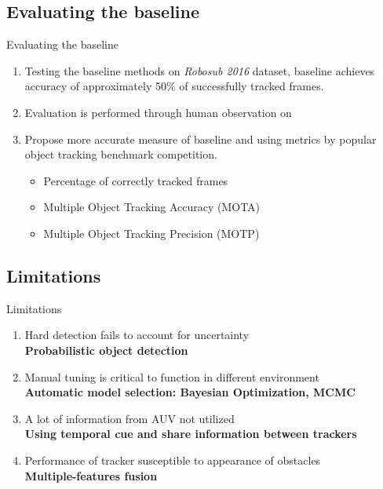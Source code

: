 \documentclass{beamer}
\begin{document}
\subsection{Evaluating the baseline}
\begin{frame}{Evaluating the baseline}
    \begin{enumerate}
        \item Testing the baseline methods on \textit{Robosub 2016} dataset, baseline achieves accuracy of approximately 50\% of successfully tracked frames.
        \item Evaluation is performed through human observation on
        \item Propose more accurate measure of baseline and using metrics by popular object tracking benchmark competition.
            \begin{itemize}
                \item Percentage of correctly tracked frames
                \item Multiple Object Tracking Accuracy (MOTA)
                \item Multiple Object Tracking Precision (MOTP)
            \end{itemize}
    \end{enumerate}
\end{frame}

\subsection{Limitations}
\begin{frame}{Limitations}
    \begin{enumerate}
        \item Hard detection fails to account for uncertainty \\ \textbf{Probabilistic object detection}
        \item Manual tuning is critical to function in different environment \\ \textbf{Automatic model selection: Bayesian Optimization, MCMC}
        \item A lot of information from AUV not utilized \\ \textbf{Using temporal cue and share information between trackers}
        \item Performance of tracker susceptible to appearance of obstacles \\ \textbf{Multiple-features fusion}
    \end{enumerate}
\end{frame}
\end{document}
